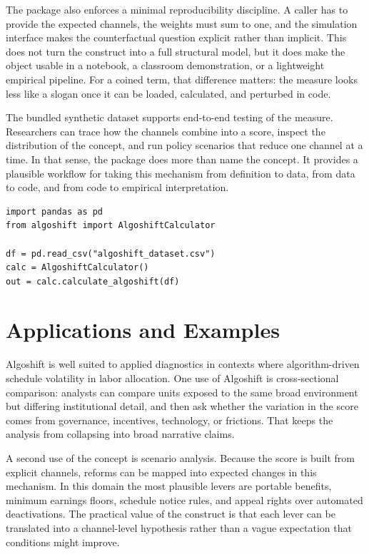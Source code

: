 \documentclass[12pt]{article}
\begin{document}
The package also enforces a minimal reproducibility discipline. A caller has to provide the expected channels, the weights must sum to one, and the simulation interface makes the counterfactual question explicit rather than implicit. This does not turn the construct into a full structural model, but it does make the object usable in a notebook, a classroom demonstration, or a lightweight empirical pipeline. For a coined term, that difference matters: the measure looks less like a slogan once it can be loaded, calculated, and perturbed in code.

The bundled synthetic dataset supports end-to-end testing of the measure. Researchers can trace how the channels combine into a score, inspect the distribution of the concept, and run policy scenarios that reduce one channel at a time. In that sense, the package does more than name the concept. It provides a plausible workflow for taking this mechanism from definition to data, from data to code, and from code to empirical interpretation.

\begin{verbatim}
import pandas as pd
from algoshift import AlgoshiftCalculator

df = pd.read_csv("algoshift_dataset.csv")
calc = AlgoshiftCalculator()
out = calc.calculate_algoshift(df)
\end{verbatim}

\section{Applications and Examples}
Algoshift is well suited to applied diagnostics in contexts where algorithm-driven schedule volatility in labor allocation. One use of Algoshift is cross-sectional comparison: analysts can compare units exposed to the same broad environment but differing institutional detail, and then ask whether the variation in the score comes from governance, incentives, technology, or frictions. That keeps the analysis from collapsing into broad narrative claims.

A second use of the concept is scenario analysis. Because the score is built from explicit channels, reforms can be mapped into expected changes in this mechanism. In this domain the most plausible levers are portable benefits, minimum earnings floors, schedule notice rules, and appeal rights over automated deactivations. The practical value of the construct is that each lever can be translated into a channel-level hypothesis rather than a vague expectation that conditions might improve.
\end{document}
